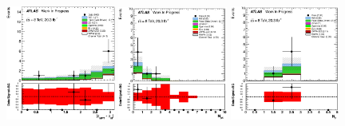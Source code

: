 \begin{figure}[ht!]
\includegraphics[width=0.32\textwidth]{figures/appendix_signal_selection/Nov24Update_FakeSys_KFacSys_LinearY_Rebin/output/jobs/MxM/DataFull_Rates_May13_FakeRatesExactly2Loose_MuonMxMBJetGt0_ElBJetGt0SubtractPC_MxM/PreselectionNov23_15_0SFOS_ChargeAbs1_BVeto85_SFMllGt20_SSMeeZVeto15_physics/weight_all/eps/DeltaPhiMET123_Abs_histratio.eps}
\includegraphics[width=0.32\textwidth]{figures/appendix_signal_selection/Nov24Update_FakeSys_KFacSys_LinearY_Rebin/output/jobs/MxM/DataFull_Rates_May13_FakeRatesExactly2Loose_MuonMxMBJetGt0_ElBJetGt0SubtractPC_MxM/PreselectionNov23_15_0SFOS_ChargeAbs1_BVeto85_SFMllGt20_SSMeeZVeto15_DeltaPhi2p5_physics/weight_all/eps/NJets_histratio.eps}
\includegraphics[width=0.32\textwidth]{figures/appendix_signal_selection/Nov24Update_FakeSys_KFacSys_LinearY_Rebin/output/jobs/MxM/DataFull_Rates_May13_FakeRatesExactly2Loose_MuonMxMBJetGt0_ElBJetGt0SubtractPC_MxM/PreselectionNov23_15_0SFOS_ChargeAbs1_BVeto85_SFMllGt20_SSMeeZVeto15_DeltaPhi2p5_NJetLt2_physics/weight_all/eps/NMuons_histratio.eps}


\end{figure}
